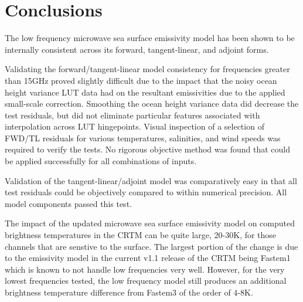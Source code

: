 \section{Conclusions}
The low frequency microwave sea surface emissivity model has been shown to be internally consistent across its forward, tangent-linear, and adjoint forms.

Validating the forward/tangent-linear model consistency for frequencies greater than 15GHz proved slightly difficult due to the impact that the noisy ocean height variance LUT data had on the resultant emissivities due to the applied small-scale correction. Smoothing the ocean height variance data did decrease the test residuals, but did not eliminate particular features associated with interpolation across LUT hingepoints. Visual inspection of a selection of FWD/TL residuals for various temperatures, salinities, and wind speeds was required to verify the tests. No rigorous objective method was found that could be applied successfully for all combinations of inputs.

Validation of the tangent-linear/adjoint model was comparatively easy in that all test residuals could be objectively compared to within numerical precision. All model components passed this test. 

The impact of the updated microwave sea surface emissivity model on computed brightness temperatures in the CRTM can be quite large, 20-30K, for those channels that are senstive to the surface. The largest portion of the change is due to the emissivity model in the current v1.1 release of the CRTM being Fastem1 which is known to not handle low frequencies very well. However, for the very lowest frequencies tested, the low frequency model still produces an additional brightness temperature difference from Fastem3 of the order of 4-8K. 

